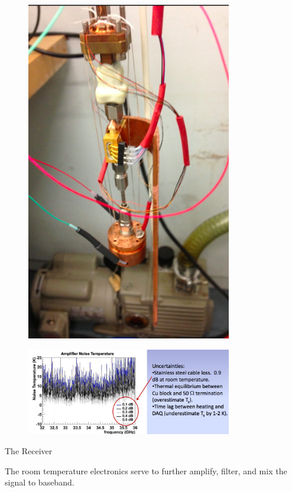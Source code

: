 \documentclass[11pt]{article}
\begin{document}
\begin{figure}
\includegraphics[width=0.8\textwidth]{noisetempmeasurement}
\end{figure}

\begin{figure}
\includegraphics[width=0.8\textwidth]{noisetemp}
\end{figure}

The Receiver

The room temperature electronics serve to further amplify, filter, and mix the signal to baseband. 
\end{document}

